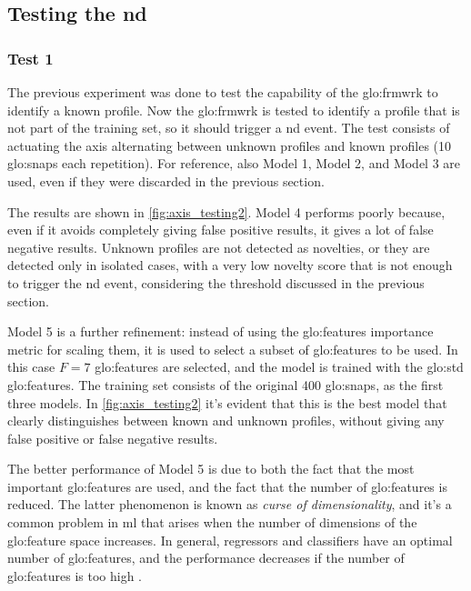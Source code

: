 \subsection{Testing the \gls{nd}}
\subsubsection{Test 1}
The previous experiment was done to test the capability of the \gls{glo:frmwrk} to identify a known profile. Now the \gls{glo:frmwrk} is tested to identify a profile that is not part of the training set, so it should trigger a \gls{nd} event. The test consists of actuating the axis alternating between unknown profiles and known profiles (10 \gls{glo:snap}s each repetition). For reference, also Model 1, Model 2, and Model 3 are used, even if they were discarded in the previous section. 

The results are shown in \autoref{fig:axis_testing2}. Model 4 performs poorly because, even if it avoids completely giving false positive results, it gives a lot of false negative results. Unknown profiles are not detected as novelties, or they are detected only in isolated cases, with a very low novelty score that is not enough to trigger the \gls{nd} event, considering the threshold discussed in the previous section.

Model 5 is a further refinement: instead of using the \gls{glo:feature}s importance metric for scaling them, it is used to select a subset of \gls{glo:feature}s to be used. In this case $F=7$ \gls{glo:feature}s are selected, and the model is trained with the \gls{glo:std} \gls{glo:feature}s. The training set consists of the original 400 \gls{glo:snap}s, as the first three models. In \autoref{fig:axis_testing2} it's evident that this is the best model that clearly distinguishes between known and unknown profiles, without giving any false positive or false negative results.

The better performance of Model 5 is due to both the fact that the most important \gls{glo:feature}s are used, and the fact that the number of \gls{glo:feature}s is reduced. The latter phenomenon is known as \emph{curse of dimensionality}, and it's a common problem in \gls{ml} that arises when the number of dimensions of the \gls{glo:feature} space increases. In general, regressors and classifiers have an optimal number of \gls{glo:feature}s, and the performance decreases if the number of \gls{glo:feature}s is too high \cite{curse_dim}. 

